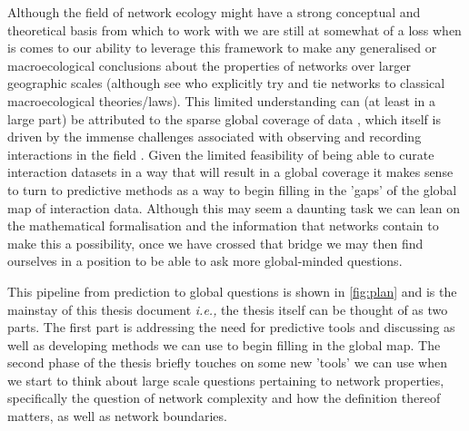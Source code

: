 Although the field of network ecology might have a strong conceptual and
theoretical basis from which to work with we are still at somewhat of a
loss when is comes to our ability to leverage this framework to make any
generalised or macroecological conclusions about the properties of networks
over larger geographic scales (although see \cite{Baiser2019Ecogeographical, Pinheiro2023Latitudinal} who explicitly try and tie networks to classical macroecological theories/laws).
This limited understanding can (at least in a large part) be attributed to
the sparse global coverage of data \cite{Poisot2021GloKno, Cameron2019UneGlo},
which itself is driven by the immense
challenges associated with observing and recording interactions in the field 
\cite{Bennett2019PotPit, Jordano2016SamNet}. Given the limited feasibility
of being able to curate interaction datasets in a way that will result in
a global coverage it makes sense to turn to predictive methods as a way to
begin filling in the 'gaps' of the global map of interaction data. Although
this may seem a daunting task we can lean on the mathematical formalisation
and the information that networks contain to make this a possibility, once
we have crossed that bridge we may then find ourselves in a position to be
able to ask more global-minded questions.

This pipeline from prediction to global questions is shown in \autoref{fig:plan}
and is the mainstay of this thesis document \emph{i.e.,} the thesis itself
can be thought of as two parts. The first part is addressing
the need for predictive tools and discussing as well as developing methods we
can use to begin filling in the global map. The second phase of the thesis briefly touches on some new 'tools' we can use when we start to think about large scale questions pertaining to network properties, specifically
the question of network complexity and how the definition thereof matters, as well
as network boundaries.

